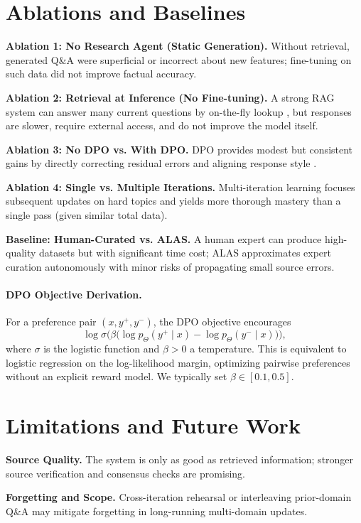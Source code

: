 \documentclass[11pt]{article}
\begin{document}
\section{Ablations and Baselines}
\textbf{Ablation 1: No Research Agent (Static Generation).} Without retrieval, generated Q\&A were superficial or incorrect about new features; fine-tuning on such data did not improve factual accuracy.

\textbf{Ablation 2: Retrieval at Inference (No Fine-tuning).} A strong RAG system can answer many current questions by on-the-fly lookup \citep{lewis2020retrieval}, but responses are slower, require external access, and do not improve the model itself.

\textbf{Ablation 3: No DPO vs. With DPO.} DPO provides modest but consistent gains by directly correcting residual errors and aligning response style \citep{rafailov2023dpo}.

\textbf{Ablation 4: Single vs. Multiple Iterations.} Multi-iteration learning focuses subsequent updates on hard topics and yields more thorough mastery than a single pass (given similar total data).

\textbf{Baseline: Human-Curated vs. ALAS.} A human expert can produce high-quality datasets but with significant time cost; ALAS approximates expert curation autonomously with minor risks of propagating small source errors.

\paragraph{DPO Objective Derivation.} For a preference pair \((x, y^+, y^-)\), the DPO objective encourages
\[
  \log \sigma\!\Big( \beta \big( \log p_{\Theta}(y^+\mid x) - \log p_{\Theta}(y^-\mid x) \big) \Big),
\]
where \(\sigma\) is the logistic function and \(\beta>0\) a temperature. This is equivalent to logistic regression on the log-likelihood margin, optimizing pairwise preferences without an explicit reward model. We typically set \(\beta \in [0.1, 0.5]\).

\section{Limitations and Future Work}
\textbf{Source Quality.} The system is only as good as retrieved information; stronger source verification and consensus checks are promising.

\textbf{Forgetting and Scope.} Cross-iteration rehearsal or interleaving prior-domain Q\&A may mitigate forgetting in long-running multi-domain updates.
\end{document}
